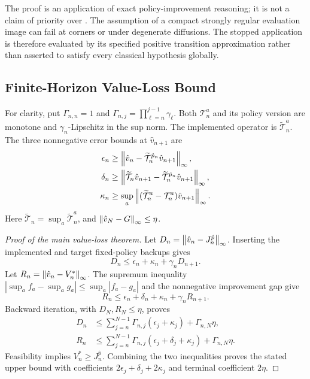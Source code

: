 The proof is an application of exact policy-improvement reasoning; it is not a claim of priority over \citet{jacka2015}. The assumption of a compact strongly regular evaluation image can fail at corners or under degenerate diffusions. The stopped application is therefore evaluated by its specified positive transition approximation rather than asserted to satisfy every classical hypothesis globally.

\subsection{Finite-Horizon Value-Loss Bound}
For clarity, put $\Gamma_{n,n}=1$ and $\Gamma_{n,j}=\prod_{\ell=n}^{j-1}\gamma_\ell$. Both $\mathcal T_n^a$ and its policy version are monotone and $\gamma_n$-Lipschitz in the sup norm. The implemented operator is $\widetilde{\mathcal T}_n^a$. The three nonnegative error bounds at $\hat v_{n+1}$ are
\begin{align*}
 \epsilon_n&\geq\left\lVert\hat v_n-\widetilde{\mathcal T}_n^{\hat p_n}\hat v_{n+1}\right\rVert_\infty,\\
 \delta_n&\geq\left\lVert\widetilde{\mathcal T}_n\hat v_{n+1}-\widetilde{\mathcal T}_n^{\hat p_n}\hat v_{n+1}\right\rVert_\infty,\\
 \kappa_n&\geq\sup_a\left\lVert(\widetilde{\mathcal T}_n^a-\mathcal T_n^a)\hat v_{n+1}\right\rVert_\infty.
\end{align*}
Here $\widetilde{\mathcal T}_n=\sup_a\widetilde{\mathcal T}_n^a$, and $\left\lVert\hat v_N-G\right\rVert_\infty\leq\eta$.

\begin{proof}[Proof of the main value-loss theorem]
Let $D_n=\left\lVert\hat v_n-J_n^{\hat p}\right\rVert_\infty$. Inserting the implemented and target fixed-policy backups gives
\[
 D_n\leq\epsilon_n+\kappa_n+\gamma_nD_{n+1}.
\]
Let $R_n=\left\lVert\hat v_n-V_n^*\right\rVert_\infty$. The supremum inequality $|\sup_a f_a-\sup_a g_a|\leq\sup_a|f_a-g_a|$ and the nonnegative improvement gap give
\[
 R_n\leq\epsilon_n+\delta_n+\kappa_n+\gamma_nR_{n+1}.
\]
Backward iteration, with $D_N,R_N\leq\eta$, proves
\begin{align*}
 D_n&\leq\sum_{j=n}^{N-1}\Gamma_{n,j}(\epsilon_j+\kappa_j)+\Gamma_{n,N}\eta,\\
 R_n&\leq\sum_{j=n}^{N-1}\Gamma_{n,j}(\epsilon_j+\delta_j+\kappa_j)+\Gamma_{n,N}\eta.
\end{align*}
Feasibility implies $V_n^*\geq J_n^{\hat p}$. Combining the two inequalities proves the stated upper bound with coefficients $2\epsilon_j+\delta_j+2\kappa_j$ and terminal coefficient $2\eta$.
\end{proof}

